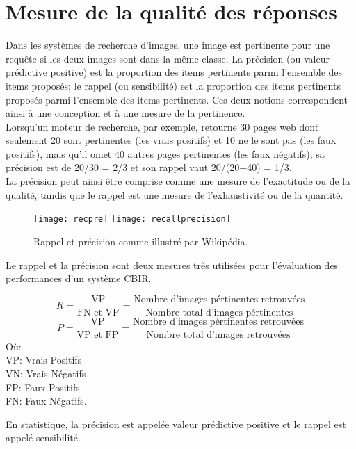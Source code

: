 \section{Mesure de la qualité des réponses}
Dans les systèmes de recherche d’images, une image est pertinente pour
une requête si les deux images sont dans la même classe.
La précision (ou valeur prédictive positive) est la proportion des items pertinents parmi l'ensemble des items proposés; le rappel (ou sensibilité) est la proportion des items pertinents proposés parmi l'ensemble des items pertinents. Ces deux notions correspondent ainsi à une conception et à une mesure de la pertinence.\\

Lorsqu'un moteur de recherche, par exemple, retourne 30 pages web dont seulement 20 sont pertinentes (les vrais positifs) et 10 ne le sont pas (les faux positifs), mais qu'il omet 40 autres pages pertinentes (les faux négatifs), sa précision est de 20/30 = 2/3 et son rappel vaut 20/(20+40) = 1/3.\\

La précision peut ainsi être comprise comme une mesure de l'exactitude ou de la qualité, tandis que le rappel est une mesure de l'exhaustivité ou de la quantité.\\


\begin{figure}[H]
	\texttt{[image: recpre]} 
	\texttt{[image: recallprecision]} 
	\caption{Rappel et précision comme illustré par Wikipédia.}
\end{figure}
Le rappel et la précision sont deux mesures très utilisées pour l’évaluation des performances d’un système CBIR. 

\begin{equation}
R = \frac{\text{VP}}{\text{FN et VP}} = \frac{\text{Nombre d'images pértinentes retrouvées} }{\text{Nombre total d'images pértinentes}}
\end{equation}
\begin{equation}
P = \frac{\text{VP}}{\text{VP et FP}} = \frac{\text{Nombre d'images pértinentes retrouvées}}{\text{Nombre total d'images retrouvées}}
\end{equation}
Où: \\
VP: Vrais Positifs\\
VN: Vrais Négatifs\\
FP: Faux Positifs\\
FN: Faux Négatifs.
 
En statistique, la précision est appelée valeur prédictive positive et  le rappel est appelé sensibilité.\\

